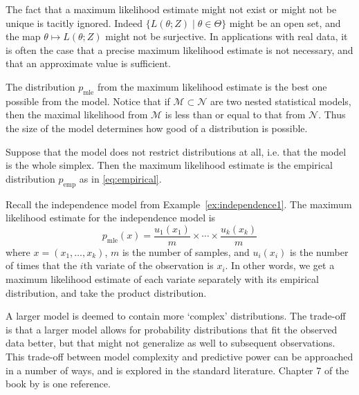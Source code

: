 \documentclass[cclicense]{hmcthesis}
\providecommand*{\ms}{\mathcal M}
\providecommand*{\ns}{\mathcal N}
\newcommand*{\mle}{\mathrm{mle}}
\newcommand*{\emp}{\mathrm{emp}}
\numberwithin{equation}{chapter}
\numberwithin{thmcounter}{chapter}
\begin{document}
    The fact that a maximum likelihood estimate might not exist or might not be
    unique is tacitly ignored.  Indeed $\{L(\theta; Z) \mid \theta \in \Theta\}$
    might be an open set, and the map $\theta \mapsto L(\theta; Z)$ might not be
    surjective.  In applications with real data, it is often the case that a
    precise maximum likelihood estimate is not necessary, and that an
    approximate value is sufficient.

    The distribution $p_\mle$ from the maximum likelihood estimate is the best
    one possible from the model.  Notice that if $\ms \subset \ns$ are two
    nested statistical models, then the maximal likelihood from $\ms$ is less
    than or equal to that from $\ns$.  Thus the size of the model determines how
    good of a distribution is possible.

    \begin{example}
        Suppose that the model does not restrict distributions at all, i.e.
        that the model is the whole simplex.  Then the maximum likelihood
        estimate is the empirical distribution $p_\emp$ as in
        \eqref{eq:empirical}.
    \end{example}

    \begin{example}
        Recall the independence model from Example~\ref{ex:independence1}.  The
        maximum likelihood estimate for the independence model is
        \[
            p_\mle(x) = \frac{u_1(x_1)}{m} \times \cdots \times \frac{u_k(x_k)}{m}
        \]
        where $x = (x_1, \ldots, x_k)$, $m$ is the number of samples, and
        $u_i(x_i)$ is the number of times that the $i$th variate of the
        observation is $x_i$.  In other words, we get a maximum likelihood
        estimate of each variate separately with its empirical distribution, and
        take the product distribution.
    \end{example}

    A larger model is deemed to contain more `complex' distributions.  The
    trade-off is that a larger model allows for probability distributions that
    fit the observed data better, but that might not generalize as well to
    subsequent observations.  This trade-off between model complexity and
    predictive power can be approached in a number of ways, and is explored in
    the standard literature.  Chapter 7 of the book by \citet{EOSL} is one
    reference.  
    
\end{document}
